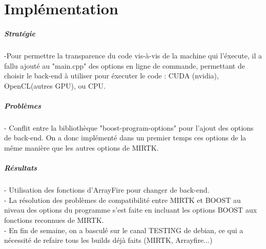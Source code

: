 \documentclass{report}
\begin{document}
\chapter*{Implémentation}	

\paragraph{Stratégie}
-Pour permettre la transparence du code vis-à-vis de la machine qui l'éxecute, il a fallu ajouté au "main.cpp" des options en ligne de commande, permettant de choisir le back-end à utiliser pour éxecuter le code : CUDA (nvidia), OpenCL(autres GPU), ou CPU.\\

\paragraph{Problèmes}
- Conflit entre la bibliothèque "boost-program-options" pour l'ajout des options de back-end. On a donc implémenté dans un premier temps ces options de la même manière que les autres options de MIRTK.\\

\paragraph{Résultats}
- Utilisation des fonctions d'ArrayFire pour changer de back-end.\\
- La résolution des problèmes de compatibilité entre MIRTK et BOOST au niveau des options du programme s'est faite en incluant les options BOOST aux fonctions reconnues de MIRTK.\\

- En fin de semaine, on a basculé sur le canal TESTING de debian, ce qui a nécessité de refaire tous les builds déjà faits (MIRTK, Arrayfire...)\\
\end{document}
